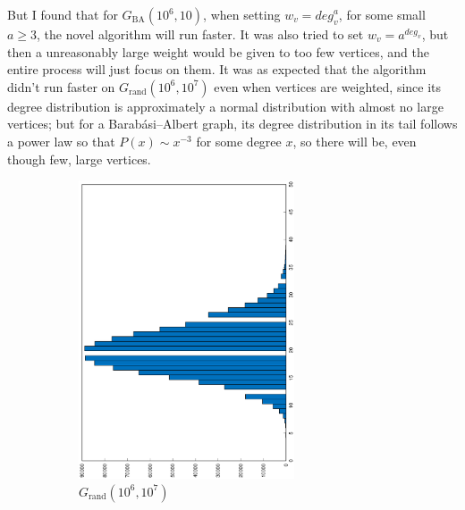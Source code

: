 \documentclass[12pt]{report}
\begin{document}
But I found that for $ G_\mathrm{BA}(10^6, 10) $, when setting $ w_v = \mathit{deg}_v^a $, for some small $ a \ge 3 $,
the novel algorithm will run faster.
It was also tried to set $ w_v = a^{\mathit{deg}_v} $,
but then a unreasonably large weight would be given to too few vertices,
and the entire process will just focus on them.
It was as expected that the algorithm didn't run faster on $ G_\mathrm{rand}(10^6, 10^7) $ even when vertices are weighted,
since its degree distribution is approximately a normal distribution with almost no large vertices;
but for a Barabási–Albert graph, its degree distribution in its tail follows a power law so that $ P(x) \sim x^{-3} $ for some degree $ x $,
so there will be, even though few, large vertices.

\begin{figure}
\centering
\begin{subfigure}{0.45\textwidth}
	\includegraphics[width=0.7\textwidth,angle=-90]{graph/uniform_degree.eps}
	\caption{$ G_\mathrm{rand}(10^6, 10^7) $}
\end{subfigure}
\begin{subfigure}{0.45\textwidth}

\end{subfigure}
\end{figure}
\end{document}
